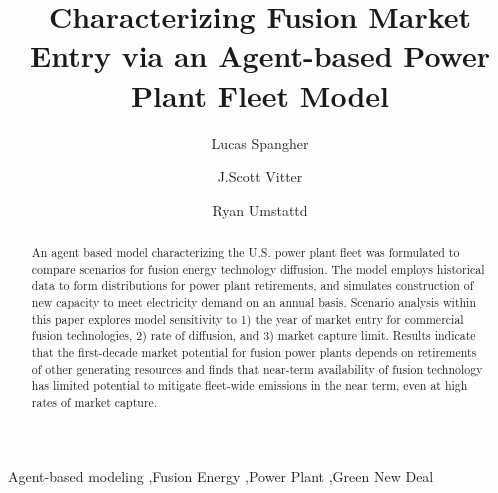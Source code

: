 \documentclass[review]{elsarticle}
\begin{document}
\begin{frontmatter}

\title{Characterizing Fusion Market Entry via an Agent-based Power Plant Fleet Model}


\author[lucas]{Lucas Spangher\corref{}}
\author[scott]{J.Scott Vitter}
\author[ryan]{Ryan Umstattd}
\address[lucas]{Corresponding author.  U.S. Department of Energy Advanced Research Projects Agency -- Energy (ARPA-E), e-mail: \url{lucas_spangher@berkeley.edu}, fax: +1 (510) 643-7846. Currently at the University of California, Berkeley.}
\address[scott]{The University of Texas at Austin, e-mail: \url{scott.vitter@utexas.edu.}}
\address[ryan]{U.S. Department of Energy Advanced Research Projects Agency -- Energy (ARPA-E), \url{Ryan.Umstattd@hq.doe.gov}}

\begin{abstract}
An agent based model characterizing the U.S. power plant fleet was formulated to compare scenarios for fusion energy technology diffusion. The model employs historical data to form distributions for power plant retirements, and simulates construction of new capacity to meet electricity demand on an annual basis. Scenario analysis within this paper explores model sensitivity to 1) the year of market entry for commercial fusion technologies, 2) rate of diffusion, and 3) market capture limit. Results indicate that the first-decade market potential for fusion power plants depends on retirements of other generating resources and finds that near-term availability of fusion technology has limited potential to mitigate fleet-wide emissions in the near term, even at high rates of market capture.  
\end{abstract}

\begin{keyword}

Agent-based modeling \sep Fusion Energy \sep Power Plant \sep Green New Deal 

\end{keyword}
\end{frontmatter}
\end{document}

